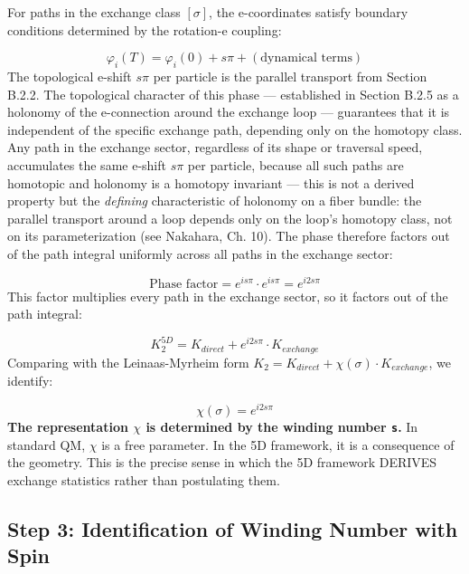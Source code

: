 \documentclass[aps,prd,preprint,superscriptaddress,longbibliography,floatfix]{revtex4-2}
\theoremstyle{remark}
\begin{document}
For paths in the exchange class $[\sigma]$, the e-coordinates satisfy boundary conditions determined by the rotation-e coupling:


\begin{equation}
    \varphi_i(T) = \varphi_i(0) + s\pi + (\text{dynamical terms})
\end{equation}
The topological e-shift $s\pi$ per particle is the parallel transport from Section B.2.2. The topological character of this phase --- established in Section B.2.5 as a holonomy of the e-connection around the exchange loop --- guarantees that it is independent of the specific exchange path, depending only on the homotopy class. Any path in the exchange sector, regardless of its shape or traversal speed, accumulates the same e-shift $s\pi$ per particle, because all such paths are homotopic and holonomy is a homotopy invariant --- this is not a derived property but the \textit{defining} characteristic of holonomy on a fiber bundle: the parallel transport around a loop depends only on the loop's homotopy class, not on its parameterization (see Nakahara, Ch. 10). The phase therefore factors out of the path integral uniformly across all paths in the exchange sector:


\begin{equation}
    \text{Phase factor} = e^{is\pi} \cdot e^{is\pi} = e^{i2s\pi}
\end{equation}
This factor multiplies every path in the exchange sector, so it factors out of the path integral:


\begin{equation}
    K_{2}^{5D} = K_{direct} + e^{i2s\pi} \cdot K_{exchange}
\end{equation}
Comparing with the Leinaas-Myrheim form $K_{2} = K_{direct} + \chi(\sigma) \cdot K_{exchange}$, we identify:


\begin{equation}
    \chi(\sigma) = e^{i2s\pi}
\end{equation}
\textbf{The representation $\chi$ is determined by the winding number \texttt{s}.} In standard QM, $\chi$ is a free parameter. In the 5D framework, it is a consequence of the geometry. This is the precise sense in which the 5D framework DERIVES exchange statistics rather than postulating them.



\subsection{Step 3: Identification of Winding Number with Spin}
\end{document}
